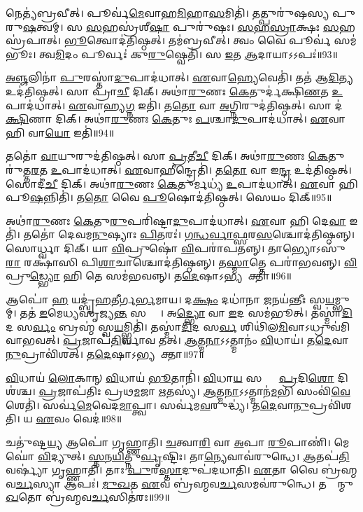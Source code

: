 𑌨𑍇𑌤𑍍𑌯॑𑌬𑍍𑌰𑌵𑍀𑌤𑍍। 𑌪𑍂𑌰𑍍𑌵॑\ul{𑌮𑍇}𑌵𑌾𑌹\ul{𑌮𑌿}𑌹𑌾\ul{𑌸}𑌮𑌿𑌤𑌿॑। 
𑌤𑌤𑍍𑌪𑍁𑌰𑍁॑𑌷𑌸𑍍𑌯 𑌪𑍁𑌰𑍁\ul{𑌷}𑌤𑍍𑌵𑌮𑍍‌। 𑌸 \ul{𑌸}𑌹𑌸𑍍𑌰॑𑌶𑍀\ur{}\ul{𑌷𑌾} 𑌪𑍁𑌰𑍁॑𑌷𑌃। 
\ul{𑌸}\ul{𑌹}\ul{𑌸𑍍𑌰𑌾}𑌕𑍍𑌷𑌃 \ul{𑌸}𑌹𑌸𑍍𑌰॑𑌪𑌾𑌤𑍍‌। \ul{𑌭𑍂}𑌤𑍍𑌵𑍋𑌦॑𑌤𑌿𑌷𑍍𑌠𑌤𑍍‌। 
𑌤𑌮॑𑌬𑍍𑌰𑌵𑍀𑌤𑍍‌। 𑌤𑍍𑌵𑌂 𑌵𑍈 𑌪𑍂𑌰𑍍𑌵॑ 𑌸𑌮॑𑌭𑍂𑌃। 
𑌤𑍍𑌵\ul{𑌮𑌿}𑌦𑌂 𑌪𑍂𑌰𑍍𑌵𑌃॑ 𑌕𑍁\ul{𑌰𑍁}𑌷𑍍𑌵𑍇𑌤𑌿॑। 𑌸 \ul{𑌇}𑌤 \ul{𑌆}𑌦𑌾𑌯𑌾𑌽𑌽𑌪𑌃॑॥93॥


\ul{𑌅}\ul{𑌞𑍍𑌜}𑌲𑌿𑌨𑌾॑ \ul{𑌪𑍁}𑌰𑌸𑍍𑌤𑌾॑\ul{𑌦𑍁}𑌪𑌾𑌦॑𑌧𑌾𑌤𑍍‌। \ul{𑌏}𑌵𑌾\ul{𑌹𑍍𑌯𑍇}𑌵𑍇𑌤𑌿॑। 
𑌤𑌤॑ 𑌆\ul{𑌦𑌿}𑌤𑍍𑌯 𑌉𑌦॑𑌤𑌿𑌷𑍍𑌠𑌤𑍍‌। 𑌸𑌾 𑌪𑍍𑌰𑌾\ul{𑌚𑍀} 𑌦𑌿𑌕𑍍‌। 
𑌅𑌥𑌾॑\ul{𑌰𑍁}𑌣𑌃 \ul{𑌕𑍇}𑌤𑍁𑌰𑍍𑌦॑𑌕𑍍𑌷𑌿\ul{𑌣}𑌤 \ul{𑌉}𑌪𑌾𑌦॑𑌧𑌾𑌤𑍍‌। 
\ul{𑌏}𑌵𑌾𑌹𑍍𑌯\ul{𑌗𑍍𑌨} 𑌇𑌤𑌿॑। 𑌤\ul{𑌤𑍋} 𑌵𑌾 \ul{𑌅}𑌗𑍍𑌨𑌿𑌰𑍁𑌦॑𑌤𑌿𑌷𑍍𑌠𑌤𑍍‌। 
𑌸𑌾 𑌦॑\ul{𑌕𑍍𑌷𑌿}𑌣𑌾 𑌦𑌿𑌕𑍍‌। 𑌅𑌥𑌾॑\ul{𑌰𑍁}𑌣𑌃 \ul{𑌕𑍇}𑌤𑍁𑌃 \ul{𑌪}𑌶𑍍𑌚𑌾\ul{𑌦𑍁}𑌪𑌾𑌦॑𑌧𑌾𑌤𑍍‌। 
\ul{𑌏}𑌵𑌾 𑌹𑌿 𑌵𑌾\ul{𑌯𑍋} 𑌇𑌤𑌿॑॥94॥


𑌤𑌤𑍋॑ \ul{𑌵𑌾}𑌯𑍁𑌰𑍁𑌦॑𑌤𑌿𑌷𑍍𑌠𑌤𑍍। 𑌸𑌾 \ul{𑌪𑍍𑌰}𑌤𑍀\ul{𑌚𑍀} 𑌦𑌿𑌕𑍍‌। 
𑌅𑌥𑌾॑\ul{𑌰𑍁}𑌣𑌃 \ul{𑌕𑍇}𑌤𑍁𑌰𑍁॑𑌤𑍍𑌤\ul{𑌰}𑌤 \ul{𑌉}𑌪𑌾𑌦॑𑌧𑌾𑌤𑍍‌। \ul{𑌏}𑌵𑌾𑌹𑍀𑌨𑍍𑌦𑍍𑌰𑍇𑌤𑌿॑। 
𑌤\ul{𑌤𑍋} 𑌵𑌾 𑌇\ul{𑌨𑍍𑌦𑍍𑌰} 𑌉𑌦॑𑌤𑌿𑌷𑍍𑌠𑌤𑍍‌। 𑌸𑍋𑌦𑍀॑\ul{𑌚𑍀} 𑌦𑌿𑌕𑍍‌। 
𑌅𑌥𑌾॑\ul{𑌰𑍁}𑌣𑌃 \ul{𑌕𑍇}𑌤𑍁𑌰𑍍𑌮𑌧𑍍𑌯॑ \ul{𑌉}𑌪𑌾𑌦॑𑌧𑌾𑌤𑍍‌। \ul{𑌏}𑌵𑌾 𑌹𑌿 𑌪𑍂\ul{𑌷}𑌨𑍍𑌨𑌿𑌤𑌿॑। 
𑌤\ul{𑌤𑍋} 𑌵𑍈 \ul{𑌪𑍂}𑌷𑍋𑌦॑𑌤𑌿𑌷𑍍𑌠𑌤𑍍‌। 𑌸𑍇𑌯𑌂 𑌦𑌿𑌕𑍍‌॥95॥


𑌅𑌥𑌾॑\ul{𑌰𑍁}𑌣𑌃 \ul{𑌕𑍇}𑌤𑍁\ul{𑌰𑍁}𑌪𑌰𑌿॑𑌷𑍍𑌟𑌾\ul{𑌦𑍁}𑌪𑌾𑌦॑𑌧𑌾𑌤𑍍‌। \ul{𑌏}𑌵𑌾 𑌹𑌿 𑌦𑍇\ul{𑌵𑌾} 𑌇𑌤𑌿॑। 
𑌤𑌤𑍋॑ 𑌦𑍇𑌵𑌮\ul{𑌨𑍁}𑌷𑍍𑌯𑌾𑌃 \ul{𑌪𑌿}𑌤𑌰𑌃॑। \ul{𑌗}\ul{𑌨𑍍𑌧}\ul{𑌰𑍍𑌵𑌾}\ul{𑌫𑍍𑌸}𑌰\ul{𑌸}𑌶𑍍𑌚𑍋𑌦॑𑌤𑌿𑌷𑍍𑌠𑌨𑍍𑌨𑍍‌। 
𑌸𑍋𑌰𑍍𑌧𑍍𑌵𑌾 𑌦𑌿𑌕𑍍‌। 𑌯𑌾 \ul{𑌵𑌿}𑌪𑍍𑌰𑍁𑌷𑍋॑ \ul{𑌵𑌿}𑌪𑌰𑌾॑𑌪𑌤𑌨𑍍𑌨𑍍‌। 
𑌤𑌾𑌭𑍍𑌯𑍋𑌽𑌸𑍁॑\ul{𑌰𑌾} 𑌰𑌕𑍍𑌷𑌾॑𑌸𑌿 𑌪𑌿\ul{𑌶𑌾}𑌚𑌾𑌶𑍍𑌚𑍋𑌦॑𑌤𑌿𑌷𑍍𑌠𑌨𑍍𑌨𑍍‌। 𑌤\ul{𑌸𑍍𑌮𑌾}𑌤𑍍𑌤𑍇 𑌪𑌰𑌾॑𑌭𑌵𑌨𑍍𑌨𑍍‌। 
\ul{𑌵𑌿}𑌪𑍍𑌰𑍁\ul{𑌡𑍍𑌭𑍍𑌯𑍋} 𑌹𑌿 𑌤𑍇 𑌸𑌮॑𑌭𑌵𑌨𑍍𑌨𑍍‌। 𑌤\ul{𑌦𑍇}𑌷𑌾𑌽𑌭𑍍𑌯𑌨𑍂᳚𑌕𑍍𑌤𑌾॥96॥


𑌆𑌪𑍋॑ \ul{𑌹} 𑌯𑌦𑍍𑌬𑍃॑\ul{𑌹}𑌤𑍀𑌰𑍍𑌗\ul{𑌰𑍍𑌭}𑌮𑌾𑌯\snn{}। 𑌦\ul{𑌕𑍍𑌷𑌂} 𑌦𑌧𑌾॑𑌨𑌾 \ul{𑌜}𑌨𑌯॑𑌨𑍍𑌤𑍀𑌃 𑌸𑍍𑌵\ul{𑌯}𑌮𑍍𑌭𑍁𑌮𑍍‌। 
𑌤𑌤॑ \ul{𑌇}𑌮𑍇𑌧𑍍𑌯𑌸𑍃॑𑌜𑍍𑌯\ul{𑌨𑍍𑌤} 𑌸𑌰𑍍𑌗𑌾𑌃᳚। 𑌅\ul{𑌦𑍍𑌭𑍍𑌯𑍋} 𑌵𑌾 \ul{𑌇}𑌦 𑌸𑌮॑𑌭𑍂𑌤𑍍‌। 
𑌤𑌸𑍍𑌮𑌾॑\ul{𑌦𑌿}𑌦 𑌸\ul{𑌰𑍍𑌵𑌂} 𑌬𑍍𑌰𑌹𑍍𑌮॑ 𑌸𑍍𑌵\ul{𑌯}𑌮𑍍𑌭𑍍𑌵𑌿𑌤𑌿॑। 
𑌤𑌸𑍍𑌮𑌾॑\ul{𑌦𑌿}𑌦 𑌸\ul{𑌰𑍍𑌵}\ul{} 𑌶𑌿𑌥𑌿॑𑌲\ul{𑌮𑌿}𑌵𑌾𑌽𑌧𑍍𑌰𑍁𑌵॑𑌮𑌿𑌵𑌾𑌭𑌵𑌤𑍍‌। 
\ul{𑌪𑍍𑌰}𑌜𑌾𑌪॑\ul{𑌤𑌿}𑌰𑍍𑌵𑌾𑌵 𑌤𑌤𑍍‌। \ul{𑌆}𑌤𑍍𑌮\ul{𑌨𑌾}𑌽𑌽𑌤𑍍𑌮𑌾𑌨𑌂॑ \ul{𑌵𑌿}𑌧𑌾𑌯॑। 
𑌤\ul{𑌦𑍇}𑌵𑌾\ul{𑌨𑍁}𑌪𑍍𑌰𑌾𑌵𑌿॑𑌶𑌤𑍍‌। 𑌤\ul{𑌦𑍇}𑌷𑌾𑌽𑌭𑍍𑌯𑌨𑍂᳚𑌕𑍍𑌤𑌾॥97॥


\ul{𑌵𑌿}𑌧𑌾𑌯॑ \ul{𑌲𑍋}𑌕𑌾𑌨𑍍‌ \ul{𑌵𑌿}𑌧𑌾𑌯॑ \ul{𑌭𑍂}𑌤𑌾𑌨𑌿॑। \ul{𑌵𑌿}𑌧𑌾\ul{𑌯} 𑌸𑌰𑍍𑌵𑌾𑌃᳚ \ul{𑌪𑍍𑌰}𑌦𑌿\ul{𑌶𑍋} 𑌦𑌿𑌶॑𑌶𑍍𑌚। 
\ul{𑌪𑍍𑌰}𑌜𑌾𑌪॑𑌤𑌿𑌃 𑌪𑍍𑌰𑌥\ul{𑌮}𑌜𑌾 \ul{𑌋}𑌤𑌸𑍍𑌯॑। \ul{𑌆}𑌤𑍍𑌮\ul{𑌨𑌾}𑌽𑌽𑌤𑍍𑌮𑌾𑌨॑\ul{𑌮}𑌭𑌿 𑌸𑌂𑌵𑌿॑\ul{𑌵𑍇}𑌶𑍇𑌤𑌿॑। 
𑌸𑌰𑍍𑌵॑\ul{𑌮𑍇}𑌵𑍇𑌦\ul{𑌮𑌾}𑌪𑍍𑌤𑍍𑌵𑌾। 𑌸𑌰𑍍𑌵॑𑌮\ul{𑌵}𑌰𑍁𑌦𑍍𑌧𑍍𑌯॑। 
𑌤\ul{𑌦𑍇}𑌵𑌾\ul{𑌨𑍁}𑌪𑍍𑌰𑌵𑌿॑𑌶𑌤𑌿। 𑌯 \ul{𑌏}𑌵𑌂 𑌵𑍇𑌦॑॥98॥\anuvakamend


𑌚𑌤𑍁॑𑌷𑍍𑌟\ul{𑌯𑍍𑌯} 𑌆𑌪𑍋॑ 𑌗𑍃𑌹𑍍𑌣𑌾𑌤𑌿। \ul{𑌚}𑌤𑍍𑌵𑌾\ul{𑌰𑌿} 𑌵𑌾 \ul{𑌅}𑌪𑌾 \ul{𑌰𑍂}𑌪𑌾𑌣𑌿॑। 
𑌮𑍇𑌘𑍋॑ \ul{𑌵𑌿}𑌦𑍍𑌯𑍁𑌤𑍍‌। \ul{𑌸𑍍𑌤}\ul{𑌨}\ul{𑌯𑌿}𑌤𑍍𑌨𑍁\ul{𑌰𑍍𑌵𑍃}𑌷𑍍𑌟𑌿𑌃। 𑌤𑌾\ul{𑌨𑍍𑌯𑍇}𑌵𑌾𑌵॑𑌰𑍁𑌨𑍍𑌧𑍇। 
\ul{𑌆}𑌤𑌪॑\ul{𑌤𑌿} 𑌵𑌰𑍍𑌷𑍍𑌯𑌾॑ 𑌗𑍃𑌹𑍍𑌣𑌾𑌤𑌿। 𑌤𑌾𑌃 \ul{𑌪𑍁}𑌰\ul{𑌸𑍍𑌤𑌾}𑌦𑍁𑌪॑𑌦𑌧𑌾𑌤𑌿। 
\ul{𑌏}𑌤𑌾 𑌵𑍈 𑌬𑍍𑌰॑𑌹𑍍𑌮𑌵\ul{𑌰𑍍𑌚}𑌸𑍍𑌯𑌾 𑌆𑌪𑌃॑। \ul{𑌮𑍁}\ul{𑌖}𑌤 \ul{𑌏}𑌵 𑌬𑍍𑌰॑𑌹𑍍𑌮𑌵\ul{𑌰𑍍𑌚}𑌸𑌮𑌵॑𑌰𑍁𑌨𑍍𑌧𑍇। 
𑌤𑌸𑍍𑌮𑌾᳚𑌨𑍍𑌮𑍁\ul{𑌖}𑌤𑍋 𑌬𑍍𑌰॑𑌹𑍍𑌮𑌵\ul{𑌰𑍍𑌚}𑌸𑌿𑌤॑𑌰𑌃॥99॥


